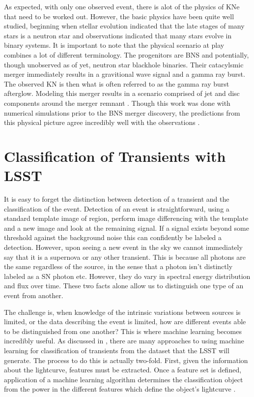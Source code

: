 \documentclass[12pt]{article}
\begin{document}
As expected, with only one observed event, there is alot of the physics of KNe that need to be worked out. However, the basic physics have been quite well studied, beginning when stellar evolution indicated that the late stages of many stars is a neutron star and observations indicated that many stars evolve in binary systems. It is important to note that the physical scenario at play combines a lot of different terminology. The progenitors are BNS and potentially, though unobserved as of yet, neutron star blackhole binaries. Their catacylsmic merger immediately results in a gravitional wave signal and a gamma ray burst. The observed KN is then what is often referred to as the gamma ray burst afterglow. Modeling this merger results in a scenario comprised of jet and disc components around the merger remnant \citep{Rosswog2016a}. Though this work was done with numerical simulations prior to the BNS merger discovery, the predictions from this physical picture agree incredibly well with the observations \citep{Kasliwal2017}.\par

\section{Classification of Transients with LSST} %
It is easy to forget the distinction between detection of a transient and the classification of the event. Detection of an event is straightforward, using a standard template image of region, perform image differencing with the template and a new image and look at the remaining signal. If a signal exists beyond some threshold against the background noise this can confidently be labeled a detection. However, upon seeing a new event in the sky we cannot immediately say that it is a supernova or any other transient. This is because all photons are the same regardless of the source, in the sense that a photon isn't distinctly labeled as a SN photon etc. However, they do vary in spectral energy distribution and flux over time. These two facts alone allow us to distinguish one type of an event from another. \par
The challenge is, when knowledge of the intrinsic variations between sources is limited, or the data describing the event is limited, how are different events able to be distinguished from one another? This is where machine learning becomes incredibly useful. As discussed in \cite{Lochner2016}, there are many approaches to using machine learning for classification of transients from the dataset that the LSST will generate. The process to do this is actually two-fold. First, given the information about the lightcurve, features must be extracted. Once a feature set is defined, application of a machine learning algorithm determines the classification object from the power in the different features which define the object's lightcurve \citep{Lochner2016}. \par
\end{document}
